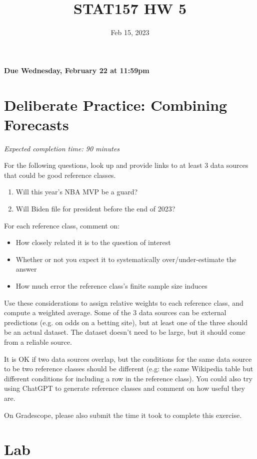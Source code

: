 \documentclass[11pt]{article}
\title{STAT157 HW 5}
\date{Feb 15, 2023}
\begin{document}
\maketitle

\hfill \textbf{Due Wednesday, February 22 at 11:59pm}

\section*{Deliberate Practice: Combining Forecasts}

\emph{Expected completion time: 90 minutes}


For the following questions, look up and provide links to at least 3 data sources that could be good reference classes. 

\begin{enumerate}
    \item Will this year's NBA MVP be a guard?
	\item Will Biden file for president before the end of 2023?
\end{enumerate}

For each reference class, comment on: 
\begin{itemize}
	\item How closely related it is to the question of interest
	\item Whether or not you expect it to systematically over/under-estimate the answer
	\item How much error the reference class's finite sample size induces
\end{itemize}

Use these considerations to assign relative weights to each reference class, and compute a weighted average. Some of the 3 data sources can be external predictions (e.g. on odds on a betting site), but at least one of the three should be an actual dataset. The dataset doesn't need to be large, but it should come from a reliable source. 

It is OK if two data sources overlap, but the conditions for the same data source to be two reference classes should be different (e.g: the same Wikipedia table but different conditions for including a row in the reference class). You could also try using ChatGPT to generate reference classes and comment on how useful they are. 

On Gradescope, please also submit the time it took to complete this exercise.

\section*{Lab}
\end{document}
